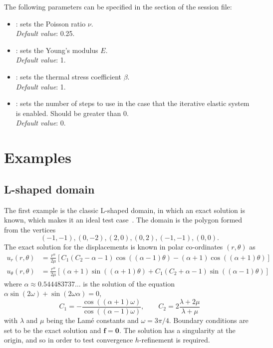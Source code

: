 The following parameters can be specified in the  section of
the session file:
\begin{itemize}
  \item {}: sets the Poisson ratio $\nu$.\\ 
  \textit{Default value}: 0.25.
  \item {}: sets the Young's modulus $E$.\\ 
  \textit{Default value}: 1.
  \item {}: sets the thermal stress coefficient $\beta$.\\ 
  \textit{Default value}: 1.
  \item {}: sets the number of steps to use in the case that the
  iterative elastic system is enabled. Should be greater than 0.\\ 
  \textit{Default value}: 0.
\end{itemize}

\section{Examples}

\subsection{L-shaped domain}

The first example is the classic L-shaped domain, in which an exact solution is
known, which makes it an ideal test case~\cite{Ko07}. The domain is the polygon
formed from the vertices
%
\[
(-1,-1), (0,-2), (2,0), (0,2), (-1,-1), (0,0).
\]
%
The exact solution for the displacements is known in polar co-ordinates
$(r,\theta)$ as
%
\begin{align*}
  u_r(r,\theta) &= \frac{r^\alpha}{2\mu} \left[
    C_1(C_2 - \alpha - 1)\cos((\alpha-1)\theta) - (\alpha+1)\cos((\alpha+1)\theta)
  \right]\\
  u_\theta(r,\theta) &= \frac{r^\alpha}{2\mu} \left[
    (\alpha+1)\sin((\alpha+1)\theta) + C_1(C_2+\alpha-1)\sin((\alpha-1)\theta)
  \right]
\end{align*}
%
where $\alpha\approx 0.544483737\dots$ is the solution of the equation
$\alpha\sin(2\omega) + \sin(2\omega\alpha) = 0$, 
%
\[
C_1 = -\frac{\cos((\alpha+1)\omega)}{\cos((\alpha-1)\omega)},\qquad
C_2 = 2\frac{\lambda + 2\mu}{\lambda+\mu}
\]
with $\lambda$ and $\mu$ being the Lam\'e constants and $\omega = 3\pi/4$.
Boundary conditions are set to be the exact solution and
$\mathbf{f} = \mathbf{0}$. The solution has a singularity at the origin, and so
in order to test convergence $h$-refinement is required.

